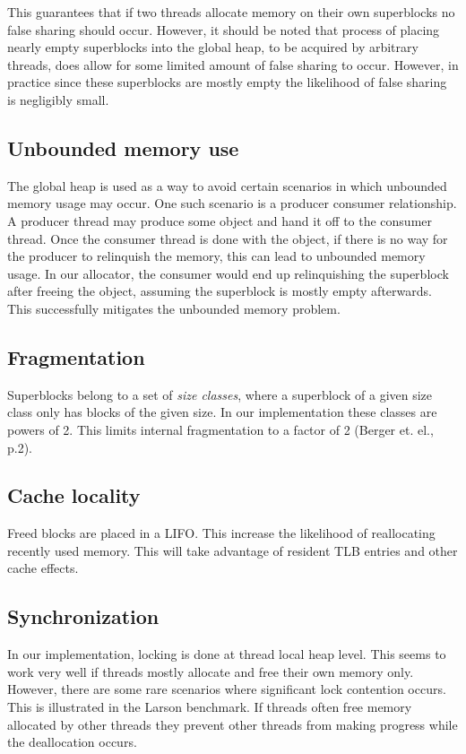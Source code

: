 \documentclass[oneside]{amsart}
\theoremstyle{definition}
\theoremstyle{remark}
\numberwithin{equation}{section}
\begin{document}
 This guarantees that if two threads allocate memory on their own superblocks no false sharing should occur. However, it should be noted that process of placing nearly empty superblocks into the global heap, to be acquired by arbitrary threads, does allow for some limited amount of false sharing to occur. However, in practice since these superblocks are mostly empty the likelihood of false sharing is negligibly small.

\subsection{Unbounded memory use}
The global heap is used as a way to avoid certain scenarios in which unbounded memory usage may occur. One such scenario is a producer consumer relationship. A producer thread may produce some object and hand it off to the consumer thread. Once the consumer thread is done with the object, if there is no way for the producer to relinquish the memory, this can lead to unbounded memory usage. In our allocator, the consumer would end up relinquishing the superblock after freeing the object, assuming the superblock is mostly empty afterwards. This successfully mitigates the unbounded memory problem.

\subsection{Fragmentation}
Superblocks belong to a set of \textit{size classes}, where a superblock of a given size class only has blocks of the given size. In our implementation these classes are powers of 2. This limits internal fragmentation to a factor of 2 (Berger et. el., p.2).

\subsection{Cache locality}
Freed blocks are placed in a LIFO. This increase the likelihood of reallocating recently used memory. This will take advantage of resident TLB entries and other cache effects.

\subsection{Synchronization}
In our implementation, locking is done at thread local heap level. This seems to work very well if threads mostly allocate and free their own memory only. However, there are some rare scenarios where significant lock contention occurs. This is illustrated in the Larson benchmark. If threads often free memory allocated by other threads they prevent other threads from making progress while the deallocation occurs. 
\end{document}
